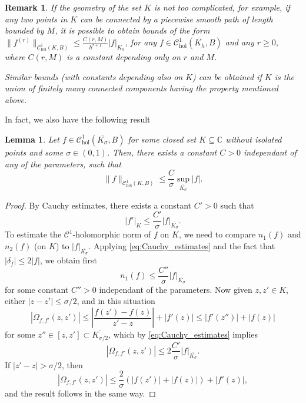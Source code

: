 \documentclass[10pt]{article}
\newtheorem{lemma}[theorem]{Lemma}
\newtheorem*{remark}{Remark}
\newcommand{\C}{\mathbb{C}}
\begin{document}
\begin{remark}
If the geometry of the set $K$ is not too complicated, for example, if any two points in $K$ can be connected by a piecewise smooth path of length bounded by $M$, it is possible to obtain bounds of the form $\|f^{(r)}\|_{\mathscr C_{\text{hol}}^1(K,B)} \leq \frac{C(r, M)}{h^{r + 1}} |f|_{K_h}$, for any $f \in \mathscr C_{\text{hol}}^1(\overline{K_h},B)$ and any $r \geq 0$, where $C(r, M)$ is a constant depending only on $r$ and $M$. 

Similar bounds (with constants depending also on $K$) can be obtained if $K$ is the union of finitely many connected components having the property mentioned above.
\end{remark}


In fact, we also have the following result

\begin{lemma}
\label{lem:c0_control}
Let $f \in \mathscr C_{\text{hol}}^1(\overline{K_\sigma},B)$ for some closed set $K \subseteq \C$ without isolated points and some $\sigma\in(0,1)$. Then, there exists a constant $C>0$ independant of any of the parameters, such that
\[
\|f\|_{\mathscr C^1_{\text{hol}}(K,B)}\leq \frac{C}{\sigma}\sup_{\overline{K_\sigma}}|f|.
\]
\end{lemma}

\begin{proof}
    By Cauchy estimates, there exists a constant $C'>0$ such that 
    \begin{equation}
    \label{eq:Cauchy_estimates}
    |f'|_{K}\leq \frac{C'}{\sigma}|f|_{\overline{K_\sigma}}.
    \end{equation}
    To estimate the $\mathscr C^1$-holomorphic norm of $f$ on $K$, we need to compare $n_1(f)$ and $n_2(f)$ (on $K$) to $|f|_{\overline{K_\sigma}}$.
    Applying \eqref{eq:Cauchy_estimates} and the fact that $|\delta_f|\leq 2|f|$, we obtain first
    \[
    n_1(f) \leq \frac{C''}{\sigma}|f|_{\overline{K_\sigma}}
    \]
    for some constant $C''>0$ independant of the parameters.
    Now given $z,z'\in K$, either $|z-z'|\leq \sigma/2$, and in this situation
    \[
    |\Omega_{f,f'}(z,z')|\leq\left|\frac{f(z')-f(z)}{z'-z}\right|+|f'(z)| \leq |f'(z'')|+|f(z)|
    \]
    for some $z''\in[z,z']\subset \overline{K_{\sigma/2}}$, which by \eqref{eq:Cauchy_estimates} implies
    \[
    |\Omega_{f,f'}(z,z')|\leq 2\frac{C'}{\sigma}|f|_{\overline{K_\sigma}}.
    \]
    If $|z'-z|>\sigma/2$, then 
    \[
    |\Omega_{f,f'}(z,z')|\leq \frac{2}{\sigma}(|f(z')|+|f(z)|)+|f'(z)|,
    \]
    and the result follows in the same way.
\end{proof}
\end{document}

